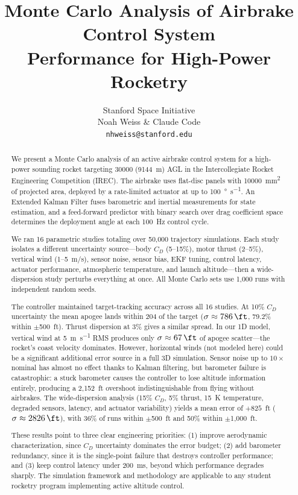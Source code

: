 \documentclass[11pt,letterpaper]{article}
\title{%
    \vspace{-1.5cm}
    \textbf{Monte Carlo Analysis of Airbrake Control System\\Performance for High-Power Rocketry}
    \vspace{0.2cm}
}
\author{Stanford Space Initiative \\[4pt]
    Noah Weiss \& Claude Code \\[2pt]
    \small\texttt{nhweiss@stanford.edu}}
\date{}
\begin{document}
\maketitle
\thispagestyle{fancy}

\begin{abstract}
We present a Monte Carlo analysis of an active airbrake control system for a high-power sounding rocket targeting \SI{30000}{\ft} (\SI{9144}{\metre}) AGL in the Intercollegiate Rocket Engineering Competition (IREC). The airbrake uses flat-disc panels with \SI{10000}{\milli\metre\squared} of projected area, deployed by a rate-limited actuator at up to \SI{100}{\degree\per\second}. An Extended Kalman Filter fuses barometric and inertial measurements for state estimation, and a feed-forward predictor with binary search over drag coefficient space determines the deployment angle at each 100~Hz control cycle.

We ran 16 parametric studies totaling over 50{,}000 trajectory simulations. Each study isolates a different uncertainty source---body $C_D$ (5--15\%), motor thrust (2--5\%), vertical wind (1--5~m/s), sensor noise, sensor bias, EKF tuning, control latency, actuator performance, atmospheric temperature, and launch altitude---then a wide-dispersion study perturbs everything at once. All Monte Carlo sets use 1{,}000 runs with independent random seeds.

The controller maintained target-tracking accuracy across all 16 studies. At 10\% $C_D$ uncertainty the mean apogee lands within \SI{204}{\ft} of the target ($\sigma \approx \SI{786}{\ft}$, 79.2\% within $\pm$500~ft). Thrust dispersion at 3\% gives a similar spread. In our 1D model, vertical wind at \SI{5}{\metre\per\second} RMS produces only $\sigma \approx \SI{67}{\ft}$ of apogee scatter---the rocket's coast velocity dominates. However, horizontal winds (not modeled here) could be a significant additional error source in a full 3D simulation. Sensor noise up to $10\times$ nominal has almost no effect thanks to Kalman filtering, but barometer failure is catastrophic: a stuck barometer causes the controller to lose altitude information entirely, producing a 2{,}152~ft overshoot indistinguishable from flying without airbrakes. The wide-dispersion analysis (15\% $C_D$, 5\% thrust, 15~K temperature, degraded sensors, latency, and actuator variability) yields a mean error of $+825$~ft ($\sigma \approx \SI{2826}{\ft}$), with 36\% of runs within $\pm$500~ft and 50\% within $\pm$1{,}000~ft.

These results point to three clear engineering priorities: (1) improve aerodynamic characterization, since $C_D$ uncertainty dominates the error budget; (2) add barometer redundancy, since it is the single-point failure that destroys controller performance; and (3) keep control latency under 200~ms, beyond which performance degrades sharply. The simulation framework and methodology are applicable to any student rocketry program implementing active altitude control.
\end{abstract}
\end{document}
